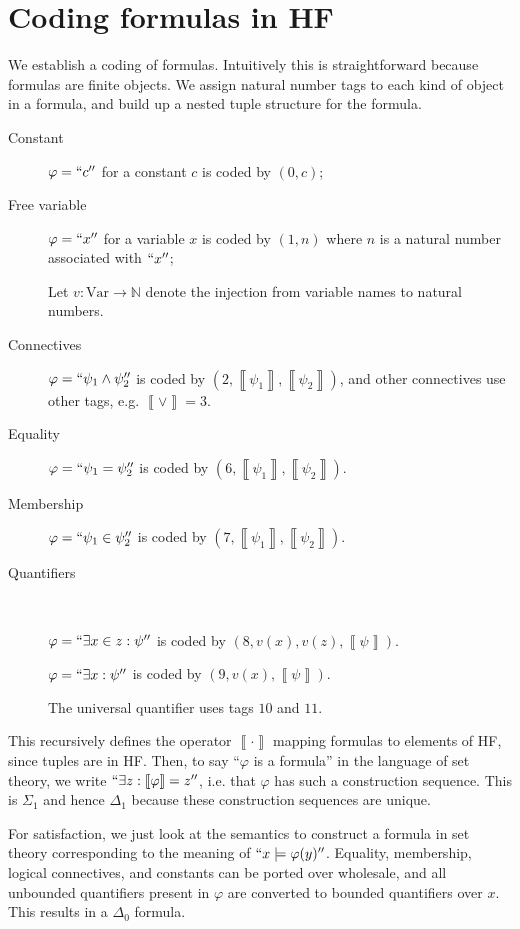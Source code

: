 \documentclass[11pt,letterpaper]{article}
\newcommand{\interp}[1]{\left\llbracket #1 \right\rrbracket}
\newcommand{\N}{\mathbb{N}}
\newcommand{\question}{\section}
\renewcommand{\phi}{\varphi}
\begin{document}
\question{Coding formulas in HF}

We establish a coding of formulas. Intuitively this is straightforward because
formulas are finite objects. We assign natural number tags to each kind of
object in a formula, and build up a nested tuple structure for the formula.

\begin{description}
    \item[Constant] $\phi = ``c''$ for a constant $c$ is coded by $(0, c)$;

    \item[Free variable] $\phi = ``x''$ for a variable $x$ is coded by $(1, n)$
        where $n$ is a natural number associated with $``x''$;

        Let $v : \mathrm{Var} \to \N$ denote the injection from variable names
        to natural numbers.

    \item[Connectives] $\phi = ``\psi_1 \land \psi_2''$
        is coded by $(2, \interp{\psi_1}, \interp{\psi_2})$, and other
        connectives use other tags, e.g. $\interp{\lor} = 3$.

    \item[Equality] $\phi = ``\psi_1 = \psi_2''$
        is coded by $(6, \interp{\psi_1}, \interp{\psi_2})$.

    \item[Membership] $\phi = ``\psi_1 \in \psi_2''$
        is coded by $(7, \interp{\psi_1}, \interp{\psi_2})$.

    \item[Quantifiers] ~

        $\phi = ``\exists x \in z : \psi''$
            is coded by $(8, v(x), v(z), \interp{\psi})$.

        $\phi = ``\exists x : \psi''$
            is coded by $(9, v(x), \interp{\psi})$.

        The universal quantifier uses tags $10$ and $11$.
\end{description}

This recursively defines the operator $\interp{\cdot}$ mapping formulas to
elements of HF, since tuples are in HF. Then, to say ``$\phi$ is a formula'' in
the language of set theory, we write $``\exists z : \interp{\phi} = z''$, i.e.
that $\phi$ has such a construction sequence. This is $\Sigma_1$ and hence
$\Delta_1$ because these construction sequences are unique.

For satisfaction, we just look at the semantics to construct a formula in set
theory corresponding to the meaning of $``x \models \phi(y)''$. Equality,
membership, logical connectives, and constants can be ported over wholesale,
and all unbounded quantifiers present in $\phi$ are converted to bounded
quantifiers over $x$. This results in a $\Delta_0$ formula.
\end{document}
